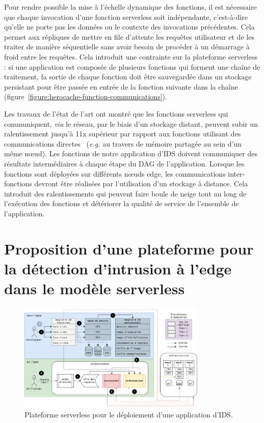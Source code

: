 Pour rendre possible la mise à l'échelle dynamique des fonctions, il est nécessaire que chaque invocation d'une fonction serverless soit indépendante, c'est-à-dire qu'elle ne porte pas les données ou le contexte des invocations précédentes. Cela permet aux répliques de mettre en file d'attente les requêtes utilisateur et de les traiter de manière séquentielle sans avoir besoin de procéder à un démarrage à froid entre les requêtes. Cela introduit une contrainte sur la plateforme serverless : si une application est composée de plusieurs fonctions qui forment une chaîne de traitement, la sortie de chaque fonction doit être sauvegardée dans un stockage persistant pour être passée en entrée de la fonction suivante dans la chaîne~\cite{mullerLambadaInteractiveData2020} (figure~\ref{figure:herocache-function-communications}).

Les travaux de l'état de l'art ont montré que les fonctions serverless qui communiquent, \textit{via} le réseau, par le biais d'un stockage distant, peuvent subir un ralentissement jusqu'à 11x supérieur par rapport aux fonctions utilisant des communications directes~\cite{wawrzoniakBoxerDataAnalytics2021a} (\textit{e.g.} au travers de mémoire partagée au sein d'un même nœud). Les fonctions de notre application d'\gls{IDS} doivent communiquer des résultats intermédiaires à chaque étape du DAG de l'application. Lorsque les fonctions sont déployées sur différents nœuds edge, les communications inter-fonctions devront être réalisées par l'utilisation d'un stockage à distance. Cela introduit des ralentissements qui peuvent faire boule de neige tout au long de l'exécution des fonctions et détériorer la qualité de service de l'ensemble de l'application.

\section{Proposition d'une plateforme pour la détection d'intrusion à l'edge dans le modèle serverless}
\label{section:herocache-before-contrib}

\begin{figure}[!ht]
    \centering
    \includegraphics[width=0.8\textwidth]{5_Chapitre5/figures/serverless-platform-storage.png}
    \caption{Plateforme serverless pour le déploiement d'une application d'\gls{IDS}.}
    \label{figure:herocache-serverless-platform}
\end{figure}

